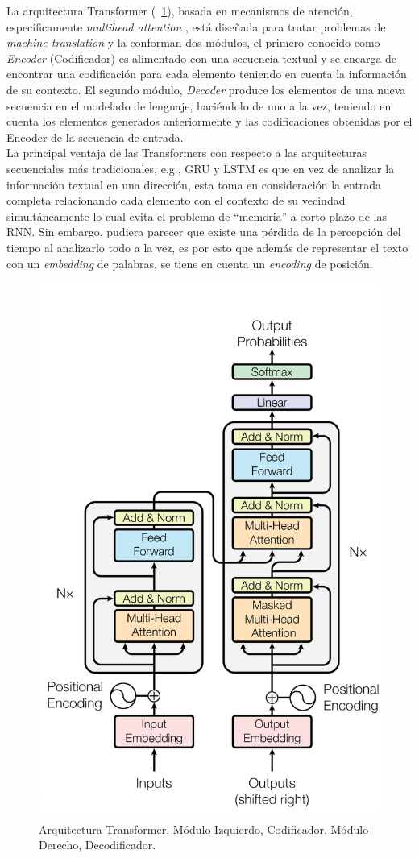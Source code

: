 	La arquitectura Transformer (\figurename~\ref{transformer}), basada en mecanismos de atención, específicamente \textit{multihead attention} \citep{vaswani2017attention}, está diseñada para tratar problemas de \textit{machine translation} y la conforman dos módulos, el primero conocido como \textit{Encoder} (Codificador) es alimentado con una secuencia textual y se encarga de encontrar una codificación para cada elemento teniendo en cuenta la información de su contexto. El segundo módulo, \textit{Decoder} produce los elementos de una nueva secuencia en el modelado de lenguaje, haciéndolo de uno a la vez, teniendo en cuenta los elementos generados anteriormente y las codificaciones obtenidas por el Encoder de la secuencia de entrada.
	\\
	La principal ventaja de las Transformers con respecto a las arquitecturas secuenciales más tradicionales, e.g., GRU y LSTM es que en vez de analizar la información textual en una dirección, esta toma en consideración la entrada completa relacionando cada elemento con el contexto de su vecindad simultáneamente lo cual evita el problema de ``memoria'' a corto plazo de las RNN.  Sin embargo, pudiera parecer que existe una pérdida de la percepción del tiempo al analizarlo todo a la vez, es por esto que además de representar el texto con un \textit{embedding} de palabras, se tiene en cuenta un \textit{encoding} de posición. 
	\begin{figure}[!thb]
		\begin{center}
			\includegraphics[width=.5\linewidth, height=.5\textheight]{images/transformer.png}
		\end{center}
		\caption[Arquitectura Transformer]{Arquitectura Transformer. Módulo Izquierdo, Codificador. Módulo Derecho, Decodificador. \citep{vaswani2017attention} }
		\label{transformer}
	\end{figure}
